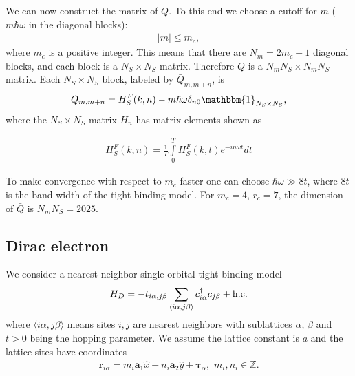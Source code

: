 \documentclass[11pt,letterpaper]{article}
\begin{document}
We can now construct the matrix of $\bar{Q}$. To this end we choose a cutoff for $m$ ($m\hbar \omega$ in the diagonal blocks):
\begin{eqnarray}
|m|\le m_c,
\end{eqnarray}
where $m_c$ is a positive integer. This means that there are $N_m = 2 m_c + 1$ diagonal blocks, and each block is a $N_S\times N_S$ matrix. Therefore $\bar{Q}$ is a $N_m N_S \times N_m N_S$ matrix. Each $N_S \times N_S$ block, labeled by $\bar{Q}_{m,m+n}$, is
\begin{eqnarray}
\bar{Q}_{m,m+n} = H_{S}^{F}(k,n) - m\hbar \omega \delta_{n0} \mathbbm{1}_{N_S\times N_S},
\end{eqnarray} 
where the $N_S \times N_S$ matrix $H_n$ has matrix elements shown as

\begin{eqnarray}
H_{S}^{F}(k,n)  =\frac{1}{T}
{\displaystyle\int\limits_{0}^{T}}
H_{S}^{F}(k,t)e^{-in\omega t}dt
\end{eqnarray}

To make convergence with respect to $m_c$ faster one can choose $\hbar \omega \gg 8t$, where $8t$ is the band width of the tight-binding model. For $m_c = 4$, $r_c = 7$, the dimension of $\bar{Q}$ is $N_m N_S = 2025$. 

\subsection{Dirac electron}
We consider a nearest-neighbor single-orbital tight-binding model
\begin{eqnarray}
	H_D = -t_{i\alpha,j\beta} \sum_{\langle i\alpha,j\beta \rangle} c_{i\alpha}^\dag c_{j\beta} + {\rm h.c.} 
\end{eqnarray}
where $\langle i\alpha,j\beta \rangle$ means sites $i, j$ are nearest neighbors with sublattices $\alpha$, $\beta$ and $t > 0$ being the hopping parameter. We assume the lattice constant is $a$ and the lattice sites have coordinates
\begin{eqnarray}
	\bm r_{i\alpha} = m_{i} \bm a_1 \hat{x} + n_{i} \bm a_2 \hat{y} + \bm \tau_{\alpha},\,\, m_{i}, n_{i} \in \mathbb{Z}.
\end{eqnarray} 
\end{document}
